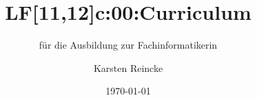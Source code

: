 \documentclass[]{beamer}
\title{LF[11,12]c:00:Curriculum}
\subtitle{für die Ausbildung zur Fachinformatikerin}
\institute{GS-LDK}
\author{Karsten Reincke}
\date{\today}
\def\cfgGl{../../../cfg.gl/}
\begin{document}

\begin{frame}
  \titlepage
\end{frame}



%




\logo{}
\newpage



%
\end{document}

